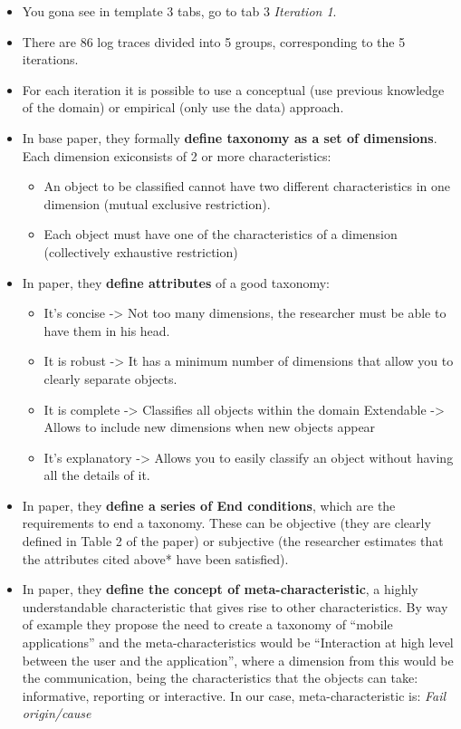 \begin{itemize}
	\item
	You gona see in template 3 tabs, go to tab 3 \emph{Iteration 1}.
	\item
	There are 86 log traces divided into 5 groups, corresponding to the 5
	iterations.
	\item
	For each iteration it is possible to use a conceptual (use previous
	knowledge of the domain) or empirical (only use the data) approach.
	\item
	In base paper, they formally \textbf{define taxonomy as a set of
		dimensions}. Each dimension exiconsists of 2 or more characteristics:
	
	\begin{itemize}
		\item
		An object to be classified cannot have two different characteristics
		in one dimension (mutual exclusive restriction).
		\item
		Each object must have one of the characteristics of a dimension
		(collectively exhaustive restriction)
	\end{itemize}
	\item
	In paper, they \textbf{define attributes} of a good taxonomy:
	
	\begin{itemize}
		\item
		It's concise -\textgreater{} Not too many dimensions, the researcher
		must be able to have them in his head.
		\item
		It is robust -\textgreater{} It has a minimum number of dimensions
		that allow you to clearly separate objects.
		\item
		It is complete -\textgreater{} Classifies all objects within the
		domain Extendable -\textgreater{} Allows to include new dimensions
		when new objects appear
		\item
		It's explanatory -\textgreater{} Allows you to easily classify an
		object without having all the details of it.
	\end{itemize}
	\item
	In paper, they \textbf{define a series of End conditions}, which are
	the requirements to end a taxonomy. These can be objective (they are
	clearly defined in Table 2 of the paper) or subjective (the researcher
	estimates that the attributes cited above* have been satisfied).
	\item
	In paper, they \textbf{define the concept of meta-characteristic}, a
	highly understandable characteristic that gives rise to other
	characteristics. By way of example they propose the need to create a
	taxonomy of ``mobile applications'' and the meta-characteristics would
	be ``Interaction at high level between the user and the application'',
	where a dimension from this would be the communication, being the
	characteristics that the objects can take: informative, reporting or
	interactive. In our case, meta-characteristic is: \emph{Fail
		origin/cause}
\end{itemize}

